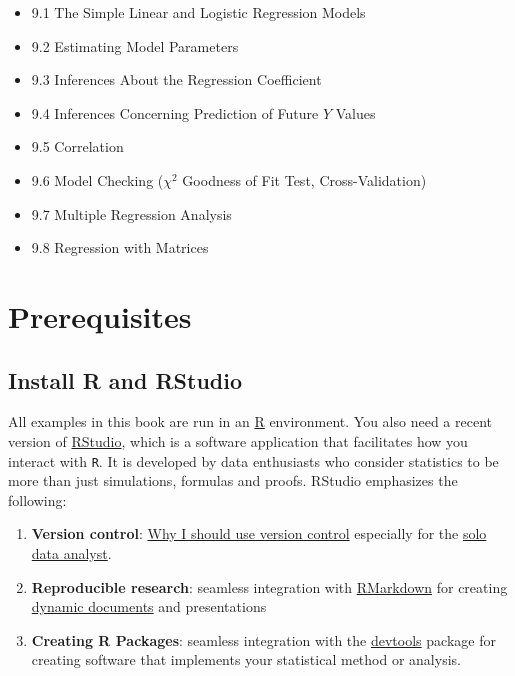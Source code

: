 \documentclass[]{book}
\providecommand{\tightlist}{%
  \setlength{\itemsep}{0pt}\setlength{\parskip}{0pt}}
\providecommand{\tightlist}{%
  \setlength{\itemsep}{0pt}\setlength{\parskip}{0pt}}
\theoremstyle{definition}
\theoremstyle{definition}
\theoremstyle{definition}
\theoremstyle{remark}
\begin{document}
\begin{itemize}
\tightlist
\item
  9.1 The Simple Linear and Logistic Regression Models\\
\item
  9.2 Estimating Model Parameters\\
\item
  9.3 Inferences About the Regression Coefficient\\
\item
  9.4 Inferences Concerning Prediction of Future \(Y\) Values\\
\item
  9.5 Correlation\\
\item
  9.6 Model Checking (\(\chi^2\) Goodness of Fit Test,
  Cross-Validation)\\
\item
  9.7 Multiple Regression Analysis\\
\item
  9.8 Regression with Matrices
\end{itemize}

\chapter*{Prerequisites}\label{prerequisites}

\section*{Install R and RStudio}\label{install-r-and-rstudio}

All examples in this book are run in an
\href{https://cran.r-project.org/}{R} environment. You also need a
recent version of
\href{https://www.rstudio.com/products/rstudio/download/preview/}{RStudio},
which is a software application that facilitates how you interact with
\texttt{R}. It is developed by data enthusiasts who consider statistics
to be more than just simulations, formulas and proofs. RStudio
emphasizes the following:

\begin{enumerate}
\def\labelenumi{\arabic{enumi}.}
\item
  \textbf{Version control}:
  \href{http://stackoverflow.com/questions/1408450/why-should-i-use-version-control}{Why
  I should use version control} especially for the
  \href{http://stackoverflow.com/questions/2712421/r-and-version-control-for-the-solo-data-analyst}{solo
  data analyst}.
\item
  \textbf{Reproducible research}: seamless integration with
  \href{http://rmarkdown.rstudio.com/}{RMarkdown} for creating
  \href{http://yihui.name/knitr/}{dynamic documents} and presentations
\item
  \textbf{Creating R Packages}: seamless integration with the
  \href{https://github.com/hadley/devtools}{devtools} package for
  creating software that implements your statistical method or analysis.
\end{enumerate}
\end{document}
